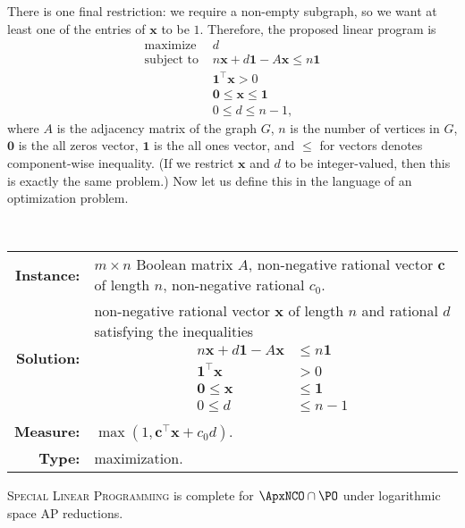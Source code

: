 \documentclass[]{article}
\begin{document}
There is one final restriction: we require a non-empty subgraph, so we want at least one of the entries of $\mathbf{x}$ to be $1$.
Therefore, the proposed linear program is
\begin{align*}
  \text{maximize } & d \\
  \text{subject to }
  & n \mathbf{x} + d \mathbf{1} - A \mathbf{x} \leq n \mathbf{1} \\
  & \mathbf{1}^\intercal \mathbf{x} > 0 \\
  & \mathbf{0} \leq \mathbf{x} \leq \mathbf{1} \\
  & 0 \leq d \leq n - 1,
\end{align*}
where $A$ is the adjacency matrix of the graph $G$, $n$ is the number of vertices in $G$, $\mathbf{0}$ is the all zeros vector, $\mathbf{1}$ is the all ones vector, and $\leq$ for vectors denotes component-wise inequality.
(If we restrict $\mathbf{x}$ and $d$ to be integer-valued, then this is exactly the same problem.)
Now let us define this in the language of an optimization problem.
\begin{definition}
  \mbox{} \\
  \begin{tabular}{r p{9.5cm}}
    \textbf{Instance:} & $m \times n$ Boolean matrix $A$, non-negative rational vector $\mathbf{c}$ of length $n$, non-negative rational $c_0$. \\
    \textbf{Solution:} & non-negative rational vector $\mathbf{x}$ of length $n$ and rational $d$ satisfying the inequalities
           {
             \begin{align*}
               n \mathbf{x} + d \mathbf{1} - A \mathbf{x} & \leq n \mathbf{1} \\
               \mathbf{1}^\intercal \mathbf{x} & > 0 \\
               \mathbf{0} \leq \mathbf{x} & \leq \mathbf{1} \\
               0 \leq d & \leq n - 1
             \end{align*}
           } \\[-1em]
    \textbf{Measure:} & $\max(1, \mathbf{c}^\intercal \mathbf{x} + c_0 d)$. \\
    \textbf{Type:} & maximization.
  \end{tabular}
\end{definition}

\begin{conjecture}
  \textsc{Special Linear Programming} is complete for $\ApxNCO \cap \PO$ under logarithmic space AP reductions.
\end{conjecture}
\end{document}
